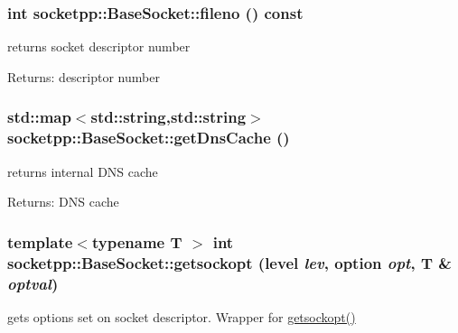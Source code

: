 \begin{CompactItemize}
{\subsubsection[{fileno}]{\setlength{\rightskip}{0pt plus 5cm}int socketpp::BaseSocket::fileno () const}}
\label{classsocketpp_1_1BaseSocket_c96db07cc917926d895d89cf73734ea1}


returns socket descriptor number 

\begin{Desc}
\item[Returns:]descriptor number \end{Desc}
\hypertarget{classsocketpp_1_1BaseSocket_52bf8df48bf4da48eff4adc690caa211}{
\subsubsection[{getDnsCache}]{\setlength{\rightskip}{0pt plus 5cm}std::map$<$std::string,std::string$>$ socketpp::BaseSocket::getDnsCache ()}}
\label{classsocketpp_1_1BaseSocket_52bf8df48bf4da48eff4adc690caa211}


returns internal DNS cache 

\begin{Desc}
\item[Returns:]DNS cache \end{Desc}
\hypertarget{classsocketpp_1_1BaseSocket_c845c3a037f0f400fd50dfb58706b6e4}{
\subsubsection[{getsockopt}]{\setlength{\rightskip}{0pt plus 5cm}template$<$typename T $>$ int socketpp::BaseSocket::getsockopt (level {\em lev}, \/  option {\em opt}, \/  T \& {\em optval})}}
\label{classsocketpp_1_1BaseSocket_c845c3a037f0f400fd50dfb58706b6e4}


gets options set on socket descriptor. Wrapper for \hyperlink{classsocketpp_1_1BaseSocket_c845c3a037f0f400fd50dfb58706b6e4}{getsockopt()} 


\end{CompactItemize}
